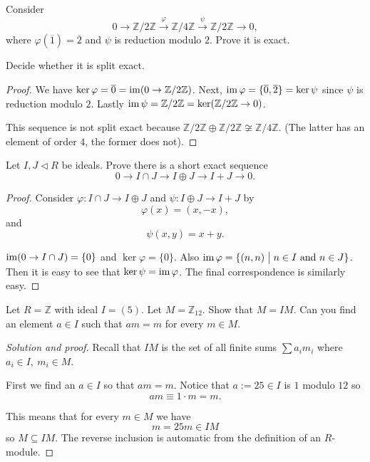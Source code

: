 \documentclass[11pt]{article}
\begin{document}
\begin{prob}
    Consider 
    \[
        0 \to \mathbb Z/2\mathbb Z 
        \overset\varphi\to \mathbb Z/4\mathbb Z 
        \overset\psi\to \mathbb Z/2\mathbb Z \to 0,
    \]
    where $\varphi(\overline 1) = \overline 2$ and 
    $\psi$ is reduction modulo $2$. 
    Prove it is exact. 

    Decide whether it is split exact. 
\end{prob}
\begin{proof}
    We have 
    $\ker \varphi = \overline 0 = \operatorname{im}(0 \to \mathbb Z/
    2\mathbb Z)$.  Next, 
    $\operatorname{im} \varphi = \{\overline 0, \overline 2\} = \ker \psi$ 
    since $\psi$ is reduction modulo $2$. 
    Lastly $\operatorname{im} \psi = \mathbb Z/2\mathbb Z = 
    \ker(\mathbb Z/2\mathbb Z \to 0)$. 
    
    This sequence is not split 
    exact because $\mathbb Z/2\mathbb Z 
    \oplus \mathbb Z/2\mathbb Z 
    \not\cong \mathbb Z/4\mathbb Z$. (The 
    latter has an element of order $4$, the former 
    does not). 
\end{proof}

\begin{prob}
    Let $I,J \triangleleft R$ be ideals. 
    Prove there is a short exact sequence 
    \[
        0 \to I \cap J 
        \to I \oplus J \to I+J \to 0. 
    \]
\end{prob}
\begin{proof}
    Consider $\varphi : I \cap J \to I \oplus J$
    and $\psi : I \oplus J \to I + J$ by 
    \[
        \varphi(x) = (x, -x), 
    \] 
    and 
    \[
        \psi(x,y) = x+y. 
    \]

    $\operatorname{im}(0 \to I \cap J) = \{0\}$ and 
    $\ker \varphi = \{0\}$. 
    Also $\im \varphi = \{(n,n) \bigm| n \in I \ \text{and} \ 
    n \in J\}$. Then it is easy to see that 
    $\ker \psi = \operatorname{im} \varphi$. The final 
    correspondence is similarly easy. 
\end{proof}

\begin{prob}
    Let $R = \mathbb Z$ with ideal 
    $I = (5)$. Let $M = \mathbb Z_{12}$. 
    Show that $M = IM$. Can you find an 
    element $a \in I$ such that 
    $am = m$ for every $m \in M$. 
\end{prob}
\begin{proof}[Solution and proof]
    Recall that $IM$ is the 
    set of all finite sums $\sum a_im_i$ where 
    $a_i \in I, \ m_i \in M$. 

    First we find an 
    $a \in I$ so that $am = m$. 
    Notice that $a:= 25 \in I$ is 
    $1$ modulo $12$ so 
    \[
        am \equiv 1 \cdot m = m. 
    \]

    This means that for every 
    $m \in M$ we have 
    \[
        m = 25m \in IM  
    \]
    so $M \subseteq IM$. 
    The reverse inclusion is automatic from 
    the definition of an $R$-module. 
\end{proof}
\end{document}
